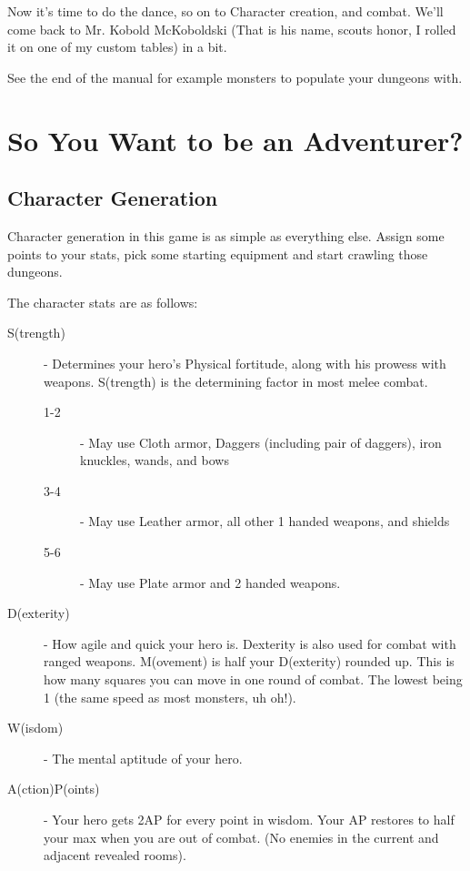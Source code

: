 \documentclass[a6paper,hidelinks]{article}
\begin{document}
Now it's time to do the dance, so on to Character creation, and combat. We'll come back to Mr. Kobold McKoboldski (That is his name, scouts honor, I rolled it on one of my custom tables) in a bit.

See the end of the manual for example monsters to populate your dungeons with.

\section{So You Want to be an Adventurer?}

\subsection{Character Generation}
Character generation in this game is as simple as everything else. Assign some points to your stats, pick some starting equipment and start crawling those dungeons.

The character stats are as follows:
\begin{description}

\item[S(trength)] - Determines your hero's Physical fortitude, along with his prowess with weapons. S(trength) is the determining factor in most melee combat.
  \begin{description}
  \item[1-2] - May use Cloth armor, Daggers (including pair of daggers), iron knuckles, wands, and bows
  \item[3-4] - May use Leather armor, all other 1 handed weapons, and shields
  \item[5-6] - May use Plate armor and 2 handed weapons.
\end{description}

\item[D(exterity)] - How agile and quick your hero is. Dexterity is also used for combat with ranged weapons.
M(ovement) is half your D(exterity) rounded up. This is how many squares you can move in one round of combat. The lowest being 1 (the same speed as most monsters, uh oh!).

\item[W(isdom)] - The mental aptitude of your hero.

\item[A(ction)P(oints)] - Your hero gets 2AP for every point in wisdom. Your AP restores to half your max when you are out of combat. (No enemies in the current and adjacent revealed rooms).

\end{description}
\end{document}
